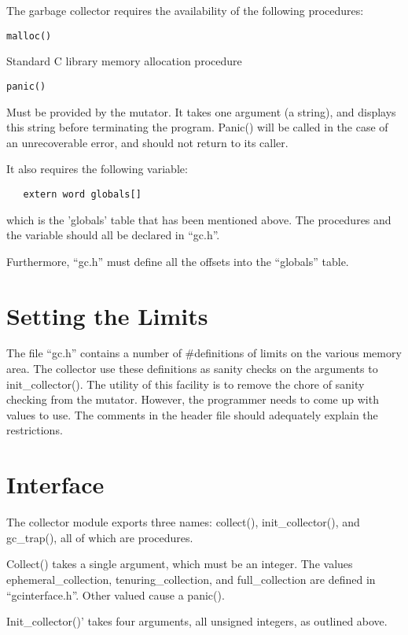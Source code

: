 The garbage collector requires the availability of the following 
procedures:
\begin{description}
\item {\tt malloc()}

Standard C library memory allocation procedure

\item {\tt panic()}

Must be provided by the mutator. It takes one argument (a string), and
displays this string before terminating the program. Panic() will be
called in the case of an unrecoverable error, and should not return to
its caller.
\end{description}
It also requires the following variable:
\begin{verbatim}
   extern word globals[]
\end{verbatim}
which is the 'globals' table that has been mentioned above.
The procedures and the variable should all be declared in ``gc.h''.

Furthermore, ``gc.h'' must define all the offsets into the ``globals'' table.


\section{Setting the Limits}

The file ``gc.h'' contains a number of \#definitions of limits on the various
memory area. The collector use these definitions as sanity checks on the
arguments to init\_collector(). The utility of this facility is to remove
the chore of sanity checking from the mutator.  However, the programmer
needs to come up with values to use. The comments in the header file should
adequately explain the restrictions.


\section{Interface}

The collector module exports three names: collect(), init\_collector(),
and gc\_trap(), all of which are procedures. 

Collect() takes a single argument, which must be an integer. The values
{\sc ephemeral\_collection}, {\sc tenuring\_collection}, and 
{\sc full\_collection} are defined
in ``gcinterface.h''. Other valued cause a panic().

Init\_collector()' takes four arguments, all unsigned integers, as outlined
above.

